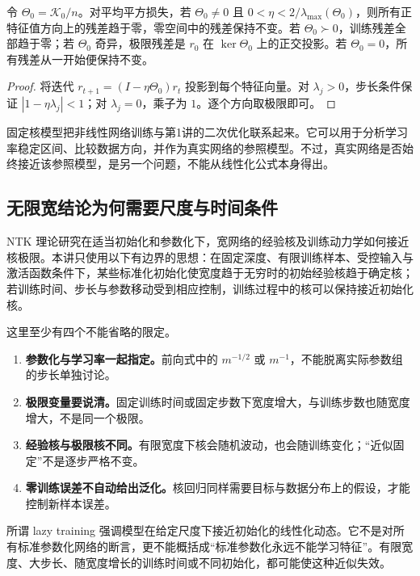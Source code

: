 \begin{proposition}[固定核模型的收敛与不可学习部分]
令 $\Theta_0=\mathcal K_0/n$。对平均平方损失，若 $\Theta_0\neq0$ 且
$0<\eta<2/\lambda_{\max}(\Theta_0)$，则所有正特征值方向上的残差趋于零，零空间中的残差保持不变。若 $\Theta_0\succ0$，训练残差全部趋于零；若 $\Theta_0$ 奇异，极限残差是 $r_0$ 在 $\ker\Theta_0$ 上的正交投影。若 $\Theta_0=0$，所有残差从一开始便保持不变。
\end{proposition}

\begin{proof}
将迭代 $r_{t+1}=(I-\eta\Theta_0)r_t$ 投影到每个特征向量。对 $\lambda_j>0$，步长条件保证 $|1-\eta\lambda_j|<1$；对 $\lambda_j=0$，乘子为 $1$。逐个方向取极限即可。
\end{proof}

固定核模型把非线性网络训练与第1讲的二次优化联系起来。它可以用于分析学习率稳定区间、比较数据方向，并作为真实网络的参照模型。不过，真实网络是否始终接近该参照模型，是另一个问题，不能从线性化公式本身得出。

\subsection{无限宽结论为何需要尺度与时间条件}

NTK 理论研究在适当初始化和参数化下，宽网络的经验核及训练动力学如何接近核极限\citep{Jacot2018}。本讲只使用以下有边界的思想：在固定深度、有限训练样本、受控输入与激活函数条件下，某些标准化初始化使宽度趋于无穷时的初始经验核趋于确定核；若训练时间、步长与参数移动受到相应控制，训练过程中的核可以保持接近初始化核。

这里至少有四个不能省略的限定。
\begin{enumerate}
 \item \textbf{参数化与学习率一起指定。}前向式中的 $m^{-1/2}$ 或 $m^{-1}$，不能脱离实际参数组的步长单独讨论。
 \item \textbf{极限变量要说清。}固定训练时间或固定步数下宽度增大，与训练步数也随宽度增大，不是同一个极限。
 \item \textbf{经验核与极限核不同。}有限宽度下核会随机波动，也会随训练变化；“近似固定”不是逐步严格不变。
 \item \textbf{零训练误差不自动给出泛化。}核回归同样需要目标与数据分布上的假设，才能控制新样本误差。
\end{enumerate}

所谓 lazy training 强调模型在给定尺度下接近初始化的线性化动态。它不是对所有标准参数化网络的断言，更不能概括成“标准参数化永远不能学习特征”。有限宽度、大步长、随宽度增长的训练时间或不同初始化，都可能使这种近似失效。

